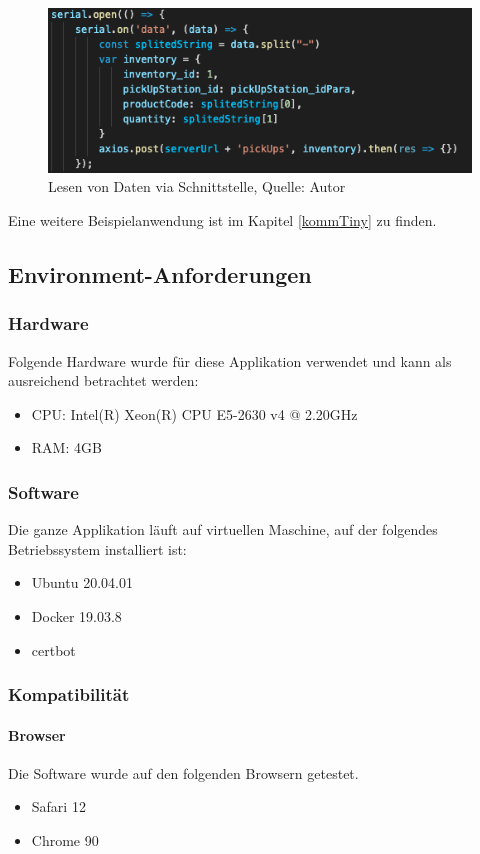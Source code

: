 \begin{figure}[H]
	\centering
	\includegraphics[scale=0.6]{images/readDataUart.png}
	\caption[Lesen von Daten via Schnittstelle]{Lesen von Daten via Schnittstelle, Quelle: Autor}
	\label{img: read}
\end{figure}

Eine weitere Beispielanwendung ist im Kapitel \ref{kommTiny} zu finden. 
\subsection{Environment-Anforderungen}\label{environmentanforderungen}
\subsubsection{Hardware}
Folgende Hardware wurde für diese Applikation verwendet und kann als ausreichend betrachtet werden:
\begin{itemize}
	\item CPU: Intel(R) Xeon(R) CPU E5-2630 v4 @ 2.20GHz
	\item RAM: 4GB
\end{itemize}
\subsubsection{Software}
Die ganze Applikation läuft auf virtuellen Maschine, auf der folgendes Betriebssystem installiert ist:
\begin{itemize}
	\item Ubuntu 20.04.01
	\item Docker 19.03.8
	\item certbot
\end{itemize}
\subsubsection{Kompatibilität}
\paragraph{Browser}
Die Software wurde auf den folgenden Browsern getestet. 
\begin{itemize}
	\item Safari 12
	\item Chrome 90
\end{itemize}
\newpage